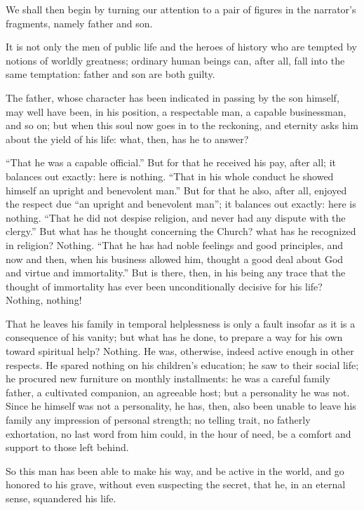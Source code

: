 \documentclass[12pt,a4paper]{book}
\begin{document}
We shall then begin by turning our attention to a pair of figures in the narrator's fragments, namely father and son.

It is not only the men of public life and the heroes of history who are tempted by notions of worldly greatness; ordinary human beings can, after all, fall into the same temptation: father and son are both guilty.

The father, whose character has been indicated in passing by the son himself, may well have been, in his position, a respectable man, a capable businessman, and so on; but when this soul now goes in to the reckoning, and eternity asks him about the yield of his life: what, then, has he to answer?

``That he was a capable official.'' But for that he received his pay, after all; it balances out exactly: here is nothing. ``That in his whole conduct he showed himself an upright and benevolent man.'' But for that he also, after all, enjoyed the respect due ``an upright and benevolent man''; it balances out exactly: here is nothing. ``That he did not despise religion, and never had any dispute with the clergy.'' But what has he thought concerning the Church? what has he recognized in religion? Nothing. ``That he has had noble feelings and good principles, and now and then, when his business allowed him, thought a good deal about God and virtue and immortality.'' But is there, then, in his being any trace that the thought of immortality has ever been unconditionally decisive for his life? Nothing, nothing!

That he leaves his family in temporal helplessness is only a fault insofar as it is a consequence of his vanity; but what has he done, to prepare a way for his own toward spiritual help? Nothing. He was, otherwise, indeed active enough in other respects. He spared nothing on his children's
education; he saw to their social life; he procured new furniture on monthly installments: he was a careful family father, a cultivated companion, an agreeable host; but a personality he was not. Since he himself was not a personality, he has, then, also been unable to leave his family any impression of personal strength; no telling trait, no fatherly exhortation, no last word from him could, in the hour of need, be a comfort and support to those left behind.

So this man has been able to make his way, and be active in the world, and go honored to his grave, without even suspecting the secret, that he, in an eternal sense, squandered his life.
\end{document}
